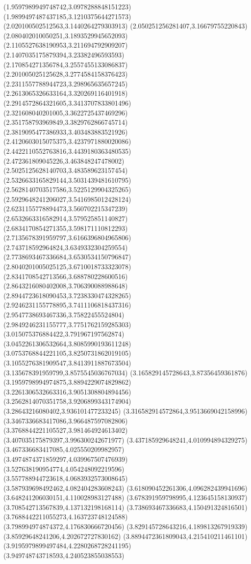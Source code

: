 {(1.9597989949748742,3.0978288848151223)
(1.9899497487437185,3.1210375644271573)
(2.020100502512563,3.1440264279303913)
(2.050251256281407,3.16679755220843)
(2.080402010050251,3.1893529945652093)
(2.1105527638190953,3.211694792909207)
(2.1407035175879394,3.23382496593593)
(2.170854271356784,3.2557455133086837)
(2.201005025125628,3.2774584158376423)
(2.2311557788944723,3.298965635657245)
(2.2613065326633164,3.320269116401918)
(2.2914572864321605,3.3413707833801496)
(2.321608040201005,3.3622725437469296)
(2.351758793969849,3.3829762866745714)
(2.3819095477386933,3.403483883521926)
(2.4120603015075375,3.4237971880020086)
(2.4422110552763816,3.4439180363480535)
(2.472361809045226,3.463848247478002)
(2.5025125628140703,3.483589623157454)
(2.5326633165829144,3.5031439481610795)
(2.5628140703517586,3.5225129904325265)
(2.5929648241206027,3.5416985012428124)
(2.6231155778894473,3.560702215347239)
(2.6532663316582914,3.579525851140827)
(2.6834170854271355,3.598171110812293)
(2.7135678391959797,3.6166396804965806)
(2.743718592964824,3.6349332304259554)
(2.7738693467336684,3.6530534150796847)
(2.8040201005025125,3.6710018733323078)
(2.8341708542713566,3.688780228600516)
(2.8643216080402008,3.706390088988648)
(2.8944723618090453,3.7238330474328265)
(2.9246231155778895,3.7411106818437316)
(2.9547738693467336,3.75822455524804)
(2.9849246231155777,3.7751762159285303)
(3.015075376884422,3.791967197562874)
(3.0452261306532664,3.8085990193611248)
(3.0753768844221105,3.8250731862019105)
(3.1055276381909547,3.8413911887673504)
(3.135678391959799,3.8575545036767034)
(3.165829145728643,3.87356459361876)
(3.1959798994974875,3.8894229074829862)
(3.2261306532663316,3.9051308804894456)
(3.2562814070351758,3.9206899343174904)
(3.28643216080402,3.936101477233245)
(3.316582914572864,3.9513669042158996)
(3.3467336683417086,3.966487597082806)
(3.3768844221105527,3.981464924613402)
(3.407035175879397,3.996300242671977)
(3.437185929648241,4.010994894329275)
(3.467336683417085,4.025550209982957)
(3.4974874371859297,4.039967507476939)
(3.527638190954774,4.054248092219596)
(3.557788944723618,4.0683932573008645)
(3.587939698492462,4.082404283608243)
(3.618090452261306,4.096282439941696)
(3.648241206030151,4.110028983127488)
(3.678391959798995,4.123645158130937)
(3.708542713567839,4.137132198168114)
(3.738693467336683,4.150491324816501)
(3.7688442211055273,4.163723748124588)
(3.798994974874372,4.176830666720456)
(3.829145728643216,4.189813267919339)
(3.85929648241206,4.202672727830162)
(3.8894472361809043,4.215410211461101)
(3.9195979899497484,4.2280268728241195)
(3.949748743718593,4.240523855038553)
}
